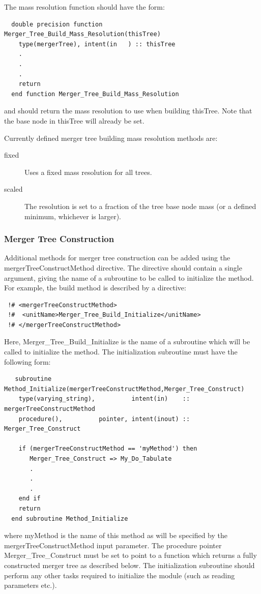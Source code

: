 The mass resolution function should have the form:
\begin{verbatim}
  double precision function Merger_Tree_Build_Mass_Resolution(thisTree)
    type(mergerTree), intent(in   ) :: thisTree
    .
    .
    .
    return
  end function Merger_Tree_Build_Mass_Resolution
\end{verbatim}
and should return the mass resolution to use when building {\normalfont \ttfamily thisTree}. Note that the base node in {\normalfont \ttfamily thisTree} will already be set.

Currently defined merger tree building mass resolution methods are:
\begin{description}
 \item [{\normalfont \ttfamily fixed}] Uses a fixed mass resolution for all trees.
 \item [{\normalfont \ttfamily scaled}] The resolution is set to a fraction of the tree base node mass (or a defined minimum, whichever is larger).
\end{description}

\subsubsection{Merger Tree Construction}\label{sec:MergerTreeConstruction}

Additional methods for merger tree construction can be added using the {\normalfont \ttfamily mergerTreeConstructMethod} directive. The directive should contain a single argument, giving the name of a subroutine to be called to initialize the method. For example, the {\normalfont \ttfamily build} method is described by a directive:
\begin{verbatim}
 !# <mergerTreeConstructMethod>
 !#  <unitName>Merger_Tree_Build_Initialize</unitName>
 !# </mergerTreeConstructMethod>
\end{verbatim}
Here, {\normalfont \ttfamily Merger\_Tree\_Build\_Initialize} is the name of a subroutine which will be called to initialize the method. The initialization subroutine must have the following form:
\begin{verbatim}
   subroutine Method_Initialize(mergerTreeConstructMethod,Merger_Tree_Construct)
    type(varying_string),          intent(in)    :: mergerTreeConstructMethod
    procedure(),          pointer, intent(inout) :: Merger_Tree_Construct
    
    if (mergerTreeConstructMethod == 'myMethod') then
       Merger_Tree_Construct => My_Do_Tabulate
       .
       .
       .
    end if
    return
  end subroutine Method_Initialize
\end{verbatim}
where {\normalfont \ttfamily myMethod} is the name of this method as will be specified by the {\normalfont \ttfamily mergerTreeConstructMethod} input parameter. The procedure pointer {\normalfont \ttfamily Merger\_Tree\_Construct} must be set to point to a function which returns a fully constructed merger tree as described below. The initialization subroutine should perform any other tasks required to initialize the module (such as reading parameters etc.).

